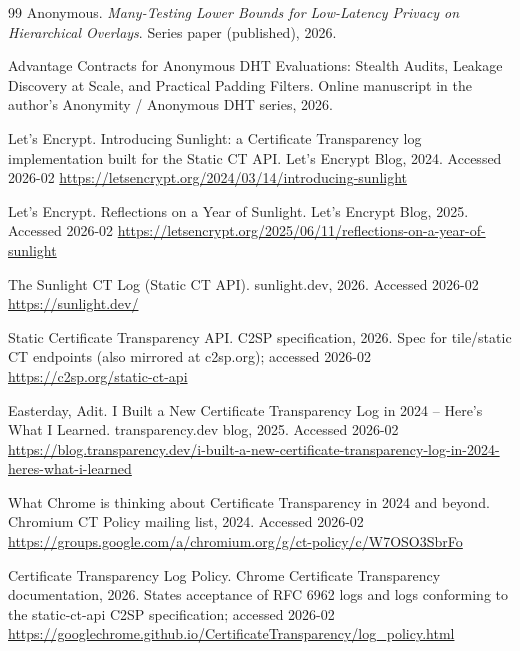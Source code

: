 \documentclass[11pt]{article}
\begin{document}
\begin{thebibliography}{99}
Anonymous.
\newblock \emph{Many-Testing Lower Bounds for Low-Latency Privacy on Hierarchical Overlays}.
\newblock Series paper (published), 2026.

\newblock Advantage Contracts for Anonymous DHT Evaluations: Stealth Audits, Leakage Discovery at Scale, and Practical Padding Filters.
\newblock Online manuscript in the author's Anonymity / Anonymous DHT series, 2026.

{Let's Encrypt}.
\newblock Introducing Sunlight: a Certificate Transparency log implementation built for the Static CT API.
\newblock Let's Encrypt Blog, 2024.
\newblock Accessed 2026-02
\newblock \url{https://letsencrypt.org/2024/03/14/introducing-sunlight}

{Let's Encrypt}.
\newblock Reflections on a Year of Sunlight.
\newblock Let's Encrypt Blog, 2025.
\newblock Accessed 2026-02
\newblock \url{https://letsencrypt.org/2025/06/11/reflections-on-a-year-of-sunlight}

\newblock The Sunlight CT Log (Static CT API).
\newblock sunlight.dev, 2026.
\newblock Accessed 2026-02
\newblock \url{https://sunlight.dev/}

\newblock Static Certificate Transparency API.
\newblock C2SP specification, 2026.
\newblock Spec for tile/static CT endpoints (also mirrored at c2sp.org); accessed 2026-02
\newblock \url{https://c2sp.org/static-ct-api}

Easterday, Adit.
\newblock I Built a New Certificate Transparency Log in 2024 -- Here's What I Learned.
\newblock transparency.dev blog, 2025.
\newblock Accessed 2026-02
\newblock \url{https://blog.transparency.dev/i-built-a-new-certificate-transparency-log-in-2024-heres-what-i-learned}

\newblock What Chrome is thinking about Certificate Transparency in 2024 and beyond.
\newblock Chromium CT Policy mailing list, 2024.
\newblock Accessed 2026-02
\newblock \url{https://groups.google.com/a/chromium.org/g/ct-policy/c/W7OSO3SbrFo}

\newblock Certificate Transparency Log Policy.
\newblock Chrome Certificate Transparency documentation, 2026.
\newblock States acceptance of {RFC 6962} logs and logs conforming to the {static-ct-api} {C2SP} specification; accessed 2026-02
\newblock \url{https://googlechrome.github.io/CertificateTransparency/log_policy.html}


\end{thebibliography}
\end{document}
